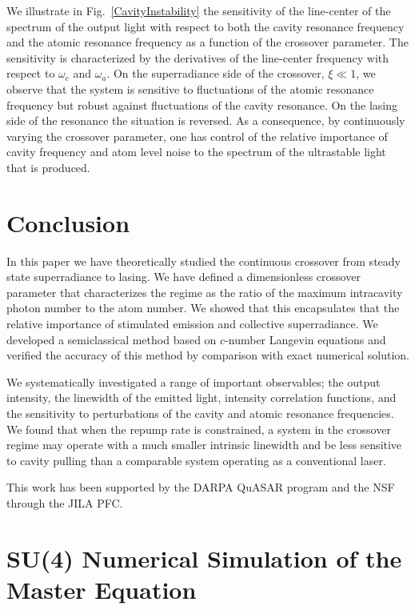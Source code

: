 \documentclass[aps,
twocolumn,
showpacs,
superscriptaddress,groupedaddress]{revtex4}
\begin{document}
We illustrate in Fig.~\ref{CavityInstability} the sensitivity of the
line-center of the spectrum of the output light with respect to both
the cavity resonance frequency and the atomic resonance frequency as a
function of the crossover parameter. The sensitivity is characterized
by the derivatives of the line-center frequency with respect to
$\omega_c$ and $\omega_a$.  On the superradiance side of the
crossover, $\xi \ll 1$, we observe that the system is sensitive to
fluctuations of the atomic resonance frequency but robust against
fluctuations of the cavity resonance.  On the lasing side of the
resonance the situation is reversed. As a consequence, by continuously
varying the crossover parameter, one has control of the relative
importance of cavity frequency and atom level noise to the spectrum of
the ultrastable light that is produced.


\section{Conclusion}

In this paper we have theoretically studied the continuous crossover
from steady state superradiance to lasing.  We have defined a
dimensionless crossover parameter that characterizes the regime as the
ratio of the maximum intracavity photon number to the atom number. We
showed that this encapsulates that the relative importance of
stimulated emission and collective superradiance. We developed a
semiclassical method based on $c$-number Langevin equations and
verified the accuracy of this method by comparison with exact
numerical solution.

We systematically investigated a range of important observables; the
output intensity, the linewidth of the emitted light, intensity
correlation functions, and the sensitivity to perturbations of the
cavity and atomic resonance frequencies.  We found that when the
repump rate is constrained, a system in the crossover regime may
operate with a much smaller intrinsic linewidth and be less
sensitive to cavity pulling than a comparable system operating as a
conventional laser.

\begin{acknowledgments}
  This work has been supported by the DARPA QuASAR program and the NSF
  through the JILA PFC.
\end{acknowledgments}


\appendix

\section{SU(4) Numerical Simulation of the Master Equation}
\label{Su4Appendix}
\end{document}
